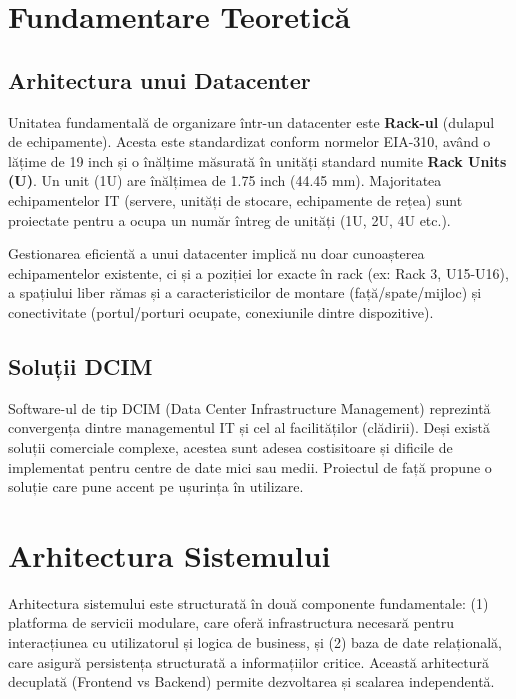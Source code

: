 \documentclass[12pt,a4paper]{article}
\begin{document}
\section{Fundamentare Teoretică}
\label{sec:fundamentare}

\subsection{Arhitectura unui Datacenter}
\label{subsec:arhitectura_dc}

Unitatea fundamentală de organizare într-un datacenter este \textbf{Rack-ul} (dulapul de echipamente). Acesta este standardizat conform normelor EIA-310, având o lățime de 19 inch și o înălțime măsurată în unități standard numite \textbf{Rack Units (U)}. Un unit (1U) are înălțimea de 1.75 inch (44.45 mm). Majoritatea echipamentelor IT (servere, unități de stocare, echipamente de rețea) sunt proiectate pentru a ocupa un număr întreg de unități (1U, 2U, 4U etc.).

Gestionarea eficientă a unui datacenter implică nu doar cunoașterea echipamentelor existente, ci și a poziției lor exacte în rack (ex: Rack 3, U15-U16), a spațiului liber rămas și a caracteristicilor de montare (față/spate/mijloc) și conectivitate (portul/porturi ocupate, conexiunile dintre dispozitive).

\subsection{Soluții DCIM}
\label{subsec:dcim}

Software-ul de tip DCIM (Data Center Infrastructure Management) reprezintă convergența dintre managementul IT și cel al facilităților (clădirii). Deși există soluții comerciale complexe, acestea sunt adesea costisitoare și dificile de implementat pentru centre de date mici sau medii. Proiectul de față propune o soluție care pune accent pe ușurința în utilizare.

\section{Arhitectura Sistemului}
\label{sec:arhitectura}

\hspace{1em}Arhitectura sistemului este structurată în două componente fundamentale: (1) platforma de servicii modulare, care oferă infrastructura necesară pentru interacțiunea cu utilizatorul și logica de business, și (2) baza de date relațională, care asigură persistența structurată a informațiilor critice. Această arhitectură decuplată (Frontend vs Backend) permite dezvoltarea și scalarea independentă.
\end{document}

